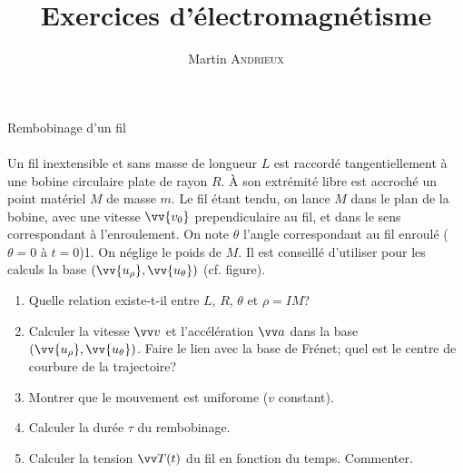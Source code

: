 \documentclass[french, a4paper, 11pt]{article}
\title{Exercices d'électromagnétisme}
\author{Martin \textsc{Andrieux}}
\date{}
\newcommand{\po}{\left(}         %
\newcommand{\pf}{\right)}        %
\newcommand{\pof}[1]{\po #1 \pf} %
\newcommand{\vect}[1]{\vv{#1}}
\newcommand{\uth}{\vect{u_\theta}}    %
\newcommand{\urho}{\vv{u_\rho}}       %
\begin{document}
\maketitle

\begin{cadre}{Rembobinage d'un fil}
  \paragraph*{}
  \begin{minipage}{0.6\linewidth}
    Un fil inextensible et sans masse de longueur $L$ est raccordé tangentiellement à une bobine circulaire plate de rayon $R$.
    À son extrémité libre est accroché un point matériel $M$ de masse $m$. Le fil étant tendu, on lance $M$ dans le plan de la bobine, avec une vitesse $\vv{v_{0}}$ prependiculaire au fil, et dans le sens correspondant à l'enroulement.
    On note $\theta$ l'angle correspondant au fil enroulé ($\theta = 0$ à $t=0$)1. On néglige le poids de $M$. Il est conseillé d'utiliser pour les calculs la base $\pof{\urho, \uth}$ (cf. figure).
    \begin{enumerate}[label=\upshape\alph*)]
      \item Quelle relation existe-t-il entre $L$, $R$, $\theta$ et $\rho = IM$?
      \item Calculer la vitesse $\vv v$ et l'accélération $\vv a$ dans la base $\pof{\urho, \uth}$. Faire le lien avec la base de Frénet; quel est le centre de courbure de la trajectoire?
      \item Montrer que le mouvement est uniforome ($v$ constant).
      \item Calculer la durée $\tau$ du rembobinage.
      \item Calculer la tension $\vv T(t)$ du fil en fonction du temps. Commenter.
    \end{enumerate}
  \end{minipage}
  \begin{minipage}{0.35\linewidth}
  \end{minipage}
\end{cadre}
\end{document}
